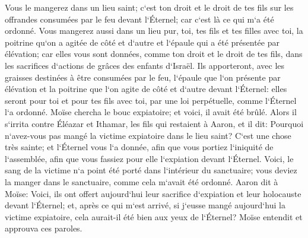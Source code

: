 \verse Vous le mangerez dans un lieu saint; c`est ton droit et le droit de tes fils sur les offrandes consumées par le feu devant l`Éternel; car c`est là ce qui m`a été ordonné. 
\verse Vous mangerez aussi dans un lieu pur, toi, tes fils et tes filles avec toi, la poitrine qu`on a agitée de côté et d`autre et l`épaule qui a été présentée par élévation; car elles vous sont données, comme ton droit et le droit de tes fils, dans les sacrifices d`actions de grâces des enfants d`Israël. 
\verse Ils apporteront, avec les graisses destinées à être consumées par le feu, l`épaule que l`on présente par élévation et la poitrine que l`on agite de côté et d`autre devant l`Éternel: elles seront pour toi et pour tes fils avec toi, par une loi perpétuelle, comme l`Éternel l`a ordonné. 
\verse Moïse chercha le bouc expiatoire; et voici, il avait été brûlé. Alors il s`irrita contre Éléazar et Ithamar, les fils qui restaient à Aaron, et il dit: 
\verse Pourquoi n`avez-vous pas mangé la victime expiatoire dans le lieu saint? C`est une chose très sainte; et l`Éternel vous l`a donnée, afin que vous portiez l`iniquité de l`assemblée, afin que vous fassiez pour elle l`expiation devant l`Éternel. 
\verse Voici, le sang de la victime n`a point été porté dans l`intérieur du sanctuaire; vous deviez la manger dans le sanctuaire, comme cela m`avait été ordonné. 
\verse Aaron dit à Moïse: Voici, ils ont offert aujourd`hui leur sacrifice d`expiation et leur holocauste devant l`Éternel; et, après ce qui m`est arrivé, si j`eusse mangé aujourd`hui la victime expiatoire, cela aurait-il été bien aux yeux de l`Éternel? 
\verse Moïse entendit et approuva ces paroles. 

